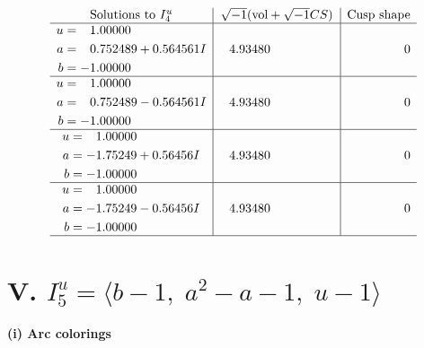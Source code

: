 \documentclass[1p]{elsarticle_modified}
\theoremstyle{definition}
\newcommand{\I}{\sqrt{-1}}
\begin{document}
$$\begin{array}{c|c|c}  
\text{Solutions to }I^u_{4}& \I (\text{vol} + \sqrt{-1}CS) & \text{Cusp shape}\\
 \hline 
\begin{aligned}
u &= \phantom{-}1.00000\phantom{ +0.000000I} \\
a &= \phantom{-}0.752489 + 0.564561 I \\
b &= -1.00000\phantom{ +0.000000I}\end{aligned}
 & \phantom{-}4.93480\phantom{ +0.000000I} & \phantom{-0.000000 } 0 \\ \hline\begin{aligned}
u &= \phantom{-}1.00000\phantom{ +0.000000I} \\
a &= \phantom{-}0.752489 - 0.564561 I \\
b &= -1.00000\phantom{ +0.000000I}\end{aligned}
 & \phantom{-}4.93480\phantom{ +0.000000I} & \phantom{-0.000000 } 0 \\ \hline\begin{aligned}
u &= \phantom{-}1.00000\phantom{ +0.000000I} \\
a &= -1.75249 + 0.56456 I \\
b &= -1.00000\phantom{ +0.000000I}\end{aligned}
 & \phantom{-}4.93480\phantom{ +0.000000I} & \phantom{-0.000000 } 0 \\ \hline\begin{aligned}
u &= \phantom{-}1.00000\phantom{ +0.000000I} \\
a &= -1.75249 - 0.56456 I \\
b &= -1.00000\phantom{ +0.000000I}\end{aligned}
 & \phantom{-}4.93480\phantom{ +0.000000I} & \phantom{-0.000000 } 0\\
 \hline 
 \end{array}$$\newpage\newpage\renewcommand{\arraystretch}{1}
\centering \section*{V. $I^u_{5}= \langle b-1,\;a^2- a-1,\;u-1 \rangle$}
\flushleft \textbf{(i) Arc colorings}\\
\end{document}
